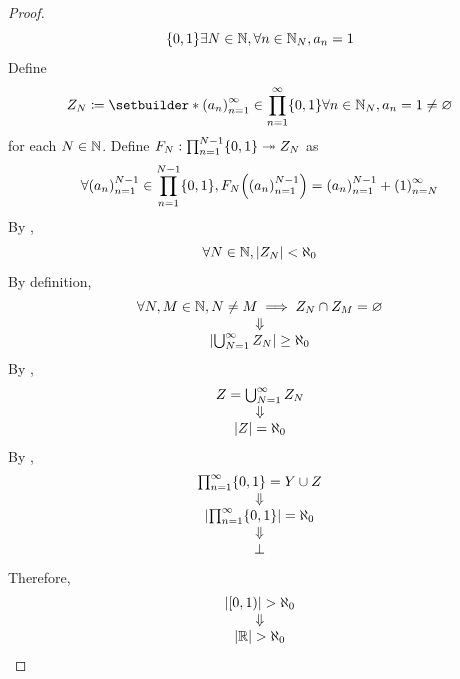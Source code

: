 \begin{proof}
\[{    \set*{0, 1}}{\exists N \in \N, \forall n \in \N_{N}, a_{n} = 1}
    \]
    Define
    \[
    Z_{N} \coloneqq \setbuilder*{\paren*{a_{n}}_{n = 1}^{\infty} \in
    \prod_{n = 1}^{\infty} \set*{0, 1}}{\forall n \in \N_{N}, a_{n} = 1} \neq \vnot
    \]
    for each $N \in \N$. Define $F_{N}: \prod_{n = 1}^{N - 1} \set*{0, 1} \twoheadrightarrow Z_{N}$ as
    \[
    \forall \paren*{a_{n}}_{n = 1}^{N - 1} \in \prod_{n = 1}^{N - 1} \set*{0, 1},
    F_{N}\paren*{\paren*{a_{n}}_{n = 1}^{N - 1}} = \paren*{a_{n}}_{n = 1}^{N - 1} + \paren*{1}_{n = N}^{\infty}
    \]
    By ,
    \[
    \forall N \in \N, \abs*{Z_{N}} < \aleph_{0}
    \]
    By definition,
    \[
    \begin{array}{c}
        \forall N, M \in \N, N \neq M \implies Z_{N} \cap Z_{M} = \vnot \\
        \Downarrow \\
        \abs*{\bigcup_{N = 1}^{\infty} Z_{N}} \geq \aleph_{0}
    \end{array}
    \]
    By ,
    \[
    \begin{array}{c}
        Z = \bigcup_{N = 1}^{\infty} Z_{N} \\
        \Downarrow \\
        \abs*{Z} = \aleph_{0}
    \end{array}
    \]
    By ,
    \[
    \begin{array}{c}
        \prod_{n = 1}^{\infty} \set*{0, 1} = Y \cup Z \\
        \Downarrow \\
        \abs*{\prod_{n = 1}^{\infty} \set*{0, 1}} = \aleph_{0} \\
        \Downarrow \\
        \bot
    \end{array}
    \]
    Therefore,
    \[
    \begin{array}{c}
        \abs*{[0, 1)} > \aleph_{0} \\
        \Downarrow \\
        \abs*{\R} > \aleph_{0}
    \end{array}
    \]
\end{proof}
